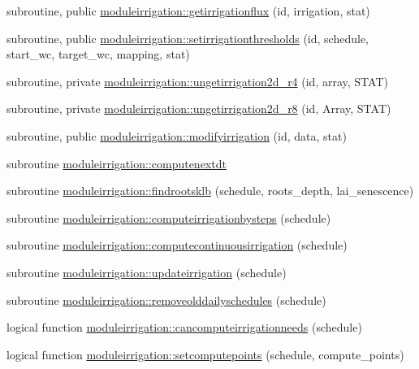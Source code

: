 \begin{DoxyCompactItemize}
\item 
subroutine, public \mbox{\hyperlink{namespacemoduleirrigation_affdb4d2e7e0c67d2c459ff6596babad9}{moduleirrigation\+::getirrigationflux}} (id, irrigation, stat)
\item 
subroutine, public \mbox{\hyperlink{namespacemoduleirrigation_a7a8a56e2b5c74ba0280ecb4abe6cc726}{moduleirrigation\+::setirrigationthresholds}} (id, schedule, start\+\_\+wc, target\+\_\+wc, mapping, stat)
\item 
subroutine, private \mbox{\hyperlink{namespacemoduleirrigation_a6f3edc54a431fcfb5b0676e0e83f9113}{moduleirrigation\+::ungetirrigation2d\+\_\+r4}} (id, array, S\+T\+AT)
\item 
subroutine, private \mbox{\hyperlink{namespacemoduleirrigation_a05ab21ff0a3d20f186805f3b6d100c9a}{moduleirrigation\+::ungetirrigation2d\+\_\+r8}} (id, Array, S\+T\+AT)
\item 
subroutine, public \mbox{\hyperlink{namespacemoduleirrigation_a1b4b8c33ee265298e1bf3cb4d19f6762}{moduleirrigation\+::modifyirrigation}} (id, data, stat)
\item 
subroutine \mbox{\hyperlink{namespacemoduleirrigation_adfeefc8d9f9d754a3a3c503b77e8b3e9}{moduleirrigation\+::computenextdt}}
\item 
subroutine \mbox{\hyperlink{namespacemoduleirrigation_a3bf1e9298115d3f00376f1288687113b}{moduleirrigation\+::findrootsklb}} (schedule, roots\+\_\+depth, lai\+\_\+senescence)
\item 
subroutine \mbox{\hyperlink{namespacemoduleirrigation_ad1bea8412119ae05c2eb3e177bcaed44}{moduleirrigation\+::computeirrigationbysteps}} (schedule)
\item 
subroutine \mbox{\hyperlink{namespacemoduleirrigation_a199776e3a4c64d2997f9a5b51681d1f6}{moduleirrigation\+::computecontinuousirrigation}} (schedule)
\item 
subroutine \mbox{\hyperlink{namespacemoduleirrigation_a5e72e31f9329f22de3b6ae1142d2371c}{moduleirrigation\+::updateirrigation}} (schedule)
\item 
subroutine \mbox{\hyperlink{namespacemoduleirrigation_a80324762e72192acef959aaff9c21571}{moduleirrigation\+::removeolddailyschedules}} (schedule)
\item 
logical function \mbox{\hyperlink{namespacemoduleirrigation_a4eb93ff5b528eade2a9dc76c368c8076}{moduleirrigation\+::cancomputeirrigationneeds}} (schedule)
\item 
logical function \mbox{\hyperlink{namespacemoduleirrigation_a3c849d3ae9b8a9b5488e452d7fb9490e}{moduleirrigation\+::setcomputepoints}} (schedule, compute\+\_\+points)

\end{DoxyCompactItemize}

